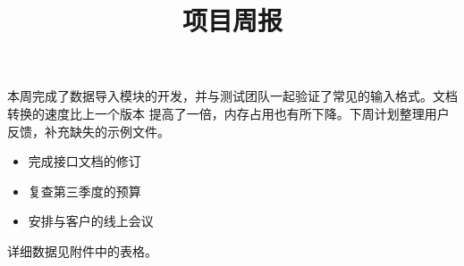 \documentclass[11pt,a4paper]{article}
\title{项目周报}
\begin{document}
\maketitle

本周完成了数据导入模块的开发，并与测试团队一起验证了常见的输入格式。文档转换的速度比上一个版本 提高了一倍，内存占用也有所下降。下周计划整理用户反馈，补充缺失的示例文件。

\begin{itemize}
\item 完成接口文档的修订
\item 复查第三季度的预算
\item 安排与客户的线上会议
\end{itemize}

详细数据见附件中的表格。
\end{document}
